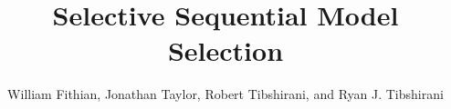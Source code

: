 \documentclass{article}
\begin{document}
\newtheorem{theorem}{Theorem}
\newtheorem{corollary}[theorem]{Corollary}
\newtheorem{lemma}[theorem]{Lemma}
\newtheorem{observation}[theorem]{Observation}
\newtheorem{proposition}[theorem]{Proposition}
\newtheorem{definition}[theorem]{Definition}
\newtheorem{claim}[theorem]{Claim}
\newtheorem{fact}[theorem]{Fact}
\newtheorem{assumption}[theorem]{Assumption}
\newtheorem{model}[theorem]{Model}

\theoremstyle{definition}
\newtheorem{example}{Example}

\newcommand{\cM}{\mathcal{M}}
\newcommand{\cH}{\mathcal{H}}
\newcommand{\cD}{\mathcal{D}}
\newcommand{\FDR}{\textnormal{FDR}}
\newcommand{\FCR}{\textnormal{FCR}}
\newcommand{\crt}{\phi}
\newcommand{\M}{\mathcal{M}}
\newcommand{\cY}{\mathcal{Y}}
\newcommand{\cX}{\mathcal{X}}
\newcommand{\cV}{\mathcal{V}}
\newcommand{\bX}{\mathbf{X}}
\newcommand{\x}{\mathbf{x}}
\newcommand{\Gv}{\;\;\big|\;\;}
\newcommand{\proj}{\cP}
\newcommand{\pow}{\text{Pow}}
\newcommand{\supp}{\text{supp}}
\newcommand{\sF}{\mathscr{F}}
\newcommand{\cF}{\mathcal{F}}
\newcommand{\sC}{\mathscr{C}}
\newcommand{\hJ}{\widehat{J}}
\newcommand{\bH}{\mathbf{H}}
\newcommand{\bM}{\mathbf{M}}
\newcommand{\tM}{\widetilde{M}}
\newcommand{\tE}{\widetilde{E}}
\newcommand{\tV}{\widetilde{V}}
\newcommand{\tR}{\widetilde{R}}
\newcommand{\tL}{\widetilde{L}}
\newcommand{\hk}{\hat{k}}
\newcommand{\hr}{\hat{r}}       
\newcommand{\cN}{\mathcal{N}}
\newcommand{\cJ}{\mathcal{J}}
\newcommand{\leqAS}{\overset{\textrm{a.s.}}{\leq}}
\newcommand{\Err}{\mathcal{E}}
\newcommand{\RSS}{\text{RSS}}


\newcommand*\mystrut{\vrule width0pt height0pt depth1.5ex\relax}
\newcommand{\underlabel}{\underbracket[1pt][.5pt]{\mystrut \quad\;\; \sub \quad\;\; }}
\newcommand{\JTcomment}[1]{{\color{blue}{(JT: \bf \sc #1) }}}
\newcommand{\WFcomment}[1]{{\color{red}{(WF: \bf \sc #1) }}}
\newcommand{\RTcomment}[1]{{\color{green}{(RT: \bf \sc #1) }}}
\newcommand{\RJTcomment}[1]{{\color{magenta}{(RJT: \bf \sc #1) }}}
\title{Selective Sequential Model Selection}
\author{William Fithian, Jonathan Taylor, Robert Tibshirani, and Ryan J. Tibshirani} 
\maketitle
\end{document}
